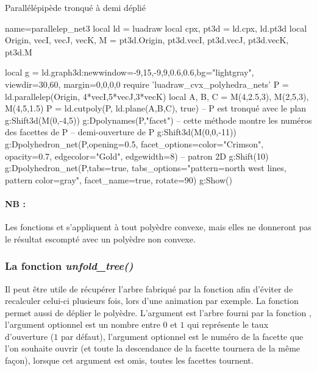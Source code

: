 \begin{demo}{Parallélépipède tronqué à demi déplié}
\begin{luadraw}{name=parallelep_net3}
local ld = luadraw
local cpx, pt3d = ld.cpx, ld.pt3d
local Origin, vecI, vecJ, vecK, M = pt3d.Origin, pt3d.vecI, pt3d.vecJ, pt3d.vecK, pt3d.M

local g = ld.graph3d:new{window={-9,15,-9,9,0.6,0.6},bg="lightgray", viewdir={30,60}, margin={0,0,0,0}} 
require 'luadraw_cvx_polyhedra_nets'
P = ld.parallelep(Origin, 4*vecI,5*vecJ,3*vecK)
local A, B, C = M(4,2.5,3), M(2,5,3), M(4,5,1.5)
P = ld.cutpoly(P, ld.plane(A,B,C), true) -- P est tronqué avec le plan
g:Shift3d(M(0,-4,5))
g:Dpolynames(P,"facet") -- cette méthode montre les numéros des facettes de P
-- demi-ouverture de P
g:Shift3d(M(0,0,-11))
g:Dpolyhedron_net(P,{opening=0.5, facet_options={color="Crimson", opacity=0.7, edgecolor="Gold", edgewidth=8}})
-- patron 2D
g:Shift(10)
g:Dpolyhedron_net(P,{tabs=true, tabs_options="pattern=north west lines, pattern color=gray", 
 facet_name=true, rotate=90})
g:Show()
\end{luadraw}
\end{demo}

\paragraph{NB :} Les fonctions  et  s'appliquent à tout polyèdre convexe, mais elles ne donneront pas le résultat escompté avec un polyèdre non convexe.

\subsubsection{La fonction \emph{unfold\_tree()}}

Il peut être utile de récupérer l'arbre fabriqué par la fonction  afin d'éviter de recalculer celui-ci plusieurs fois, lors d'une animation par exemple. La fonction  permet aussi de déplier le polyèdre. L'argument est l'arbre fourni par la fonction , l'argument optionnel  est un nombre entre $0$ et $1$ qui représente le taux d'ouverture ($1$ par défaut), l'argument optionnel  est le numéro de la facette que l'on souhaite ouvrir (et toute la descendance de la facette tournera de la même façon), lorsque cet argument est omis, toutes les facettes tournent.

